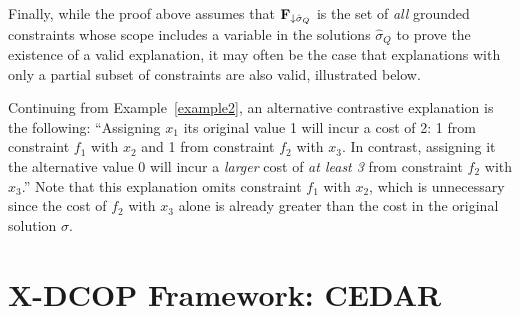 \documentclass[twoside,11pt]{article}
\begin{document}
Finally, while the proof above assumes that ${\bf{F}}_{\downarrow \hat{\sigma}_Q}$ is the set of \emph{all} grounded constraints whose scope includes a variable in the solutions $\hat{\sigma}_Q$ to prove the existence of a valid explanation, it may often be the case that explanations with only a partial subset of constraints are also valid, illustrated below.

\begin{example}
\label{example3}
Continuing from Example~\ref{example2}, an alternative contrastive explanation is the following: ``Assigning $x_1$ its original value 1 will incur a cost of 2: 1 from constraint $f_1$ with $x_2$ and 1 from constraint $f_2$ with $x_3$. In contrast, assigning it the alternative value 0 will incur a \emph{larger} cost of \emph{at least 3} from constraint $f_2$ with $x_3$.'' Note that this explanation omits constraint $f_1$ with $x_2$, which is unnecessary since the cost of $f_2$ with $x_3$ alone is already greater than the cost in the original solution $\sigma$.
\end{example}


\section{X-DCOP Framework: CEDAR}\label{sec:framework}
\end{document}
